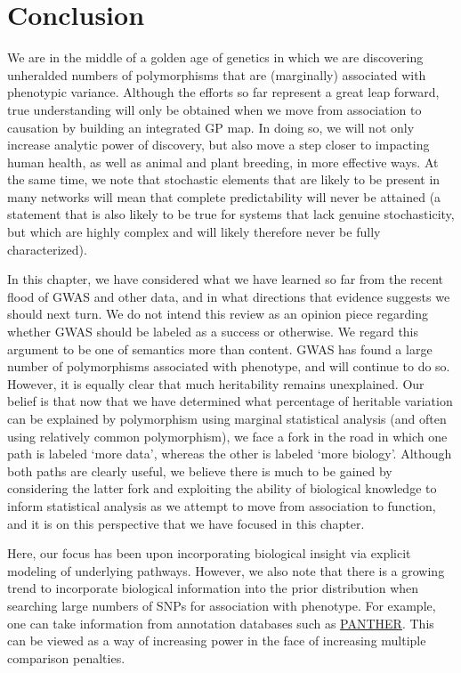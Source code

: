 \section{Conclusion}
We are in the middle of a golden age of genetics in which we are discovering unheralded numbers of polymorphisms that are (marginally) associated with phenotypic variance. Although the efforts so far represent a great leap forward, true understanding will only be obtained when we move from association to causation by building an integrated GP map. In doing so, we will not only increase analytic power of discovery, but also move a step closer to impacting human health, as well as animal and plant breeding, in more effective ways. At the same time, we note that stochastic elements that are likely to be present in many networks will mean that complete predictability will never be attained (a statement that is also likely to be true for systems that lack genuine stochasticity, but which are highly complex and will likely therefore never be fully characterized).

In this chapter, we have considered what we have learned so far from the recent flood of GWAS and other data, and in what directions that evidence suggests we should next turn. We do not intend this review as an opinion piece regarding whether GWAS should be labeled as a success or otherwise. We regard this argument to be one of semantics more than content. GWAS has found a large number of polymorphisms associated with phenotype, and will continue to do so. However, it is equally clear that much heritability remains unexplained. Our belief is that now that we have determined what percentage of heritable variation can be explained by polymorphism using marginal statistical analysis (and often using relatively common polymorphism), we face a fork in the road in which one path is labeled `more data', whereas the other is labeled `more biology'. Although both paths are clearly useful, we believe there is much to be gained by considering the latter fork and exploiting the ability of biological knowledge to inform statistical analysis as we attempt to move from association to function, and it is on this perspective that we have focused in this chapter.

Here, our focus has been upon incorporating biological insight via explicit modeling of underlying pathways. However, we also note that there is a growing trend to incorporate biological information into the prior distribution when searching large numbers of SNPs for association with phenotype. For example, one can take information from annotation databases such as \href{http://www. pantherdb.org/}{PANTHER}. This can be viewed as a way of increasing power in the face of increasing multiple comparison penalties.

